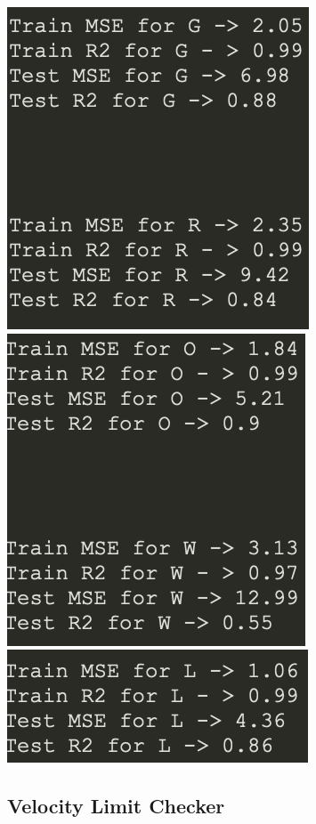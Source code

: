 \documentclass[a4paper]{article}
\begin{document}
\begin{center}
\includegraphics[scale=0.75]{images/3_1.png}  
\includegraphics[scale=0.75]{images/3_2.png}  
\includegraphics[scale=0.75]{images/3_3.png}
\end{center}

\subsection{Velocity Limit Checker}
\end{document}
